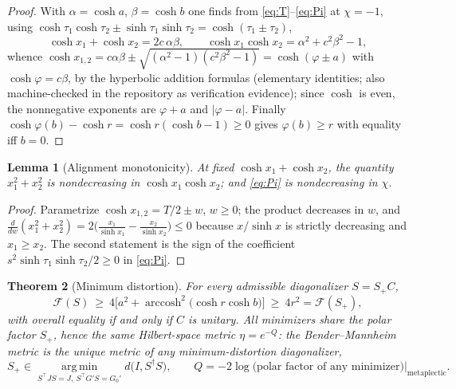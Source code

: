 \documentclass[11pt]{article}
\newtheorem{theorem}{Theorem}[section]
\newtheorem{lemma}[theorem]{Lemma}
\theoremstyle{definition}
\theoremstyle{remark}
\newcommand{\dg}{\dagger}
\newcommand{\arccosh}{\operatorname{arccosh}}
\begin{document}
\begin{proof}
With $\alpha=\cosh a$, $\beta=\cosh b$ one finds from
\eqref{eq:T}--\eqref{eq:Pi} at $\chi=-1$, using
$\cosh\tau_1\cosh\tau_2\pm\sinh\tau_1\sinh\tau_2=\cosh(\tau_1\pm\tau_2)$,
\[
\cosh x_1+\cosh x_2=2c\,\alpha\beta,
\qquad
\cosh x_1\cosh x_2=\alpha^2+c^2\beta^2-1 ,
\]
whence
$\cosh x_{1,2}=c\alpha\beta\pm\sqrt{(\alpha^2-1)(c^2\beta^2-1)}
=\cosh(\varphi\pm a)$ with $\cosh\varphi=c\beta$, by the hyperbolic
addition formulas (elementary identities; also machine-checked in the
repository as verification evidence); since $\cosh$ is even, the
nonnegative exponents are $\varphi+a$ and $|\varphi-a|$.  Finally
$\cosh\varphi(b)-\cosh r=\cosh r(\cosh b-1)\ge0$ gives $\varphi(b)\ge r$ with
equality iff $b=0$.
\end{proof}

\begin{lemma}[Alignment monotonicity]\label{lem:monotone}
At fixed $\cosh x_1+\cosh x_2$, the quantity $x_1^2+x_2^2$ is nondecreasing
in $\cosh x_1\cosh x_2$; and \eqref{eq:Pi} is nondecreasing in $\chi$.
\end{lemma}

\begin{proof}
Parametrize $\cosh x_{1,2}=T/2\pm w$, $w\ge0$; the product decreases in $w$,
and
$\frac{d}{dw}(x_1^2+x_2^2)=2\big(\frac{x_1}{\sinh x_1}-\frac{x_2}{\sinh x_2}\big)
\le0$
because $x/\sinh x$ is strictly decreasing and $x_1\ge x_2$.  The second
statement is the sign of the coefficient
$s^2\sinh\tau_1\sinh\tau_2/2\ge0$ in \eqref{eq:Pi}.
\end{proof}

\begin{theorem}[Minimum distortion]\label{thm:mindist}
For every admissible diagonalizer $S=S_+C$,
\begin{equation}
\mathcal F(S)\ \ge\
4\Big[a^2+\arccosh^2\big(\cosh r\cosh b\big)\Big]\ \ge\ 4r^2=\mathcal F(S_+),
\end{equation}
with overall equality if and only if $C$ is unitary.  All minimizers share
the polar factor $S_+$, hence the same Hilbert-space metric
$\eta=e^{-Q}$: the Bender--Mannheim metric is the unique metric of any
minimum-distortion diagonalizer,
\begin{equation}
S_+\in\operatorname*{arg\,min}_{S^{\top}JS=J,\ S^{\top}G'S=G_0'}
d\big(I,S^{\dg}S\big),
\qquad
Q=-2\log\big(\text{polar factor of any minimizer}\big)\big|_{\text{metaplectic}} .
\end{equation}
\end{theorem}
\end{document}
